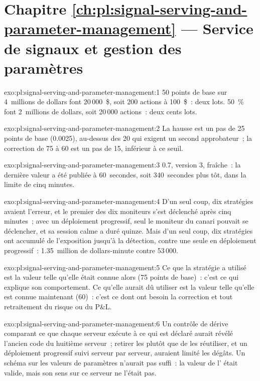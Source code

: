 \section*{Chapitre \ref{ch:pl:signal-serving-and-parameter-management} --- Service de signaux et gestion des paramètres}

\begin{solution}{exo:pl:signal-serving-and-parameter-management:1}
50 points de base sur 4~millions de dollars font 20\,000~\$, soit 200 actions à 100~\$~: deux lots. 50~\% font 2~millions de dollars, soit 20\,000 actions~: deux cents lots.
\end{solution}

\begin{solution}{exo:pl:signal-serving-and-parameter-management:2}
La hausse est un pas de 25 points de base (0.0025), au-dessus des 20 qui exigent un second approbateur~; la correction de 75 à 60 est un pas de 15, inférieur
à ce seuil.
\end{solution}

\begin{solution}{exo:pl:signal-serving-and-parameter-management:3}
0.7, version 3, fraîche~: la dernière valeur a été publiée à 60~secondes, soit 340~secondes plus tôt, dans la limite de cinq minutes.
\end{solution}

\begin{solution}{exo:pl:signal-serving-and-parameter-management:4}
D'un seul coup, dix stratégies avaient l'erreur, et le premier des dix moniteurs s'est déclenché après cinq minutes~; avec un déploiement progressif, seul le moniteur du canari pouvait se déclencher, et sa session calme a duré quinze.
Mais d'un seul coup, dix stratégies ont accumulé de l'exposition jusqu'à la détection, contre une seule en déploiement progressif~: 1.35~million
de dollars-minute contre 53\,000.
\end{solution}

\begin{solution}{exo:pl:signal-serving-and-parameter-management:5}
Ce que la stratégie a utilisé est la valeur telle qu'elle était connue alors (75 points de base)~: c'est ce qui explique son comportement. Ce qu'elle aurait dû utiliser est la valeur
telle qu'elle est connue maintenant (60)~: c'est ce dont ont besoin la correction et tout retraitement du risque ou du P\&L.
\end{solution}

\begin{solution}{exo:pl:signal-serving-and-parameter-management:6}
Un contrôle de dérive comparant ce que chaque serveur exécute à ce qui est déclaré aurait révélé l'ancien code du huitième serveur~; retirer les  plutôt que de les réutiliser,
et un déploiement progressif suivi serveur par serveur, auraient limité les dégâts. Un schéma sur les valeurs de paramètres n'aurait pas suffi~: la valeur
de l' était valide, mais son sens sur ce serveur ne l'était pas.
\end{solution}

